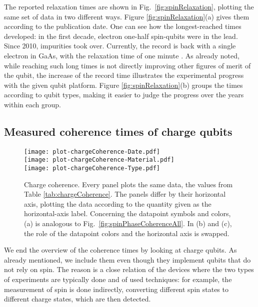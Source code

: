 \documentclass[aps, prx, showpacs, twocolumn, superscriptaddress, notitlepage, longbibliography, floatfix, nofootinbib]{revtex4-2}
\newcommand{\recheck}[1]{{#1}}
\begin{document}
The reported relaxation times are shown in Fig.~\ref{fig:spinRelaxation}, plotting the same set of data in two different ways. Figure \ref{fig:spinRelaxation}(a) gives them according to the publication date. One can see how the longest-reached times developed: in the first decade, electron one-half spin-qubits were in the lead. Since 2010, impurities took over. \recheck{Currently, the record is back with a single electron in GaAs, with the relaxation time of one minute \cite{camenzind_hyperfine-phonon_2018}.} As already noted, while reaching such long times is not directly improving other figures of merit of the qubit, the increase of the record time illustrates the experimental progress with the given qubit platform. Figure \ref{fig:spinRelaxation}(b) groups the times according to qubit types, making it easier to judge the progress over the years within each group. 




\subsection{Measured coherence times of charge qubits}

\begin{figure}
  \texttt{[image: plot-chargeCoherence-Date.pdf]} \hfill \\
  \texttt{[image: plot-chargeCoherence-Material.pdf]} \hfill \\
  \texttt{[image: plot-chargeCoherence-Type.pdf]}\\
  \caption{
 \label{fig:chargeCoherence}
  Charge coherence. Every panel plots the same data, the values from Table \ref{tab:chargeCoherence}. The panels differ by their horizontal axis, plotting the data according to the quantity given as the horizontal-axis label. Concerning the datapoint symbols and colors, (a) is analogous to Fig.~\ref{fig:spinPhaseCoherenceAll}. In (b) and (c), the role of the datapoint colors and the horizontal axis is swapped. 
  }
\end{figure}

We end the overview of the coherence times by looking at charge qubits. As already mentioned, we include them even though they implement qubits that do not rely on spin. The reason is a close relation of the devices where the two types of experiments are typically done and of used techniques: for example, the measurement of spin is done indirectly, converting different spin states to different charge states, which are then detected. 
\end{document}

